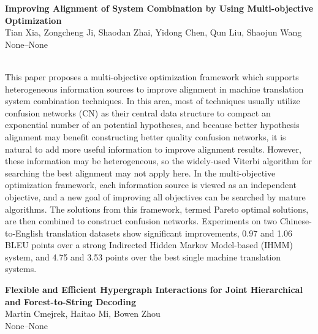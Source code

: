 \documentclass[twoside,makeidx]{book}
\begin{document}
\par\vspace{2em}\noindent%
\begin{minipage}{\linewidth}%
\begin{center}
\textbf{\normalsize Improving Alignment of System Combination by Using Multi-objective Optimization}\\
\normalsize  Tian Xia,  Zongcheng Ji,  Shaodan Zhai,  Yidong Chen,  Qun Liu,  Shaojun Wang\\
{\small None--None}\\
\end{center}
\end{minipage}\\[0.5em]
\nopagebreak%
\noindent%
{\small This paper proposes a multi-objective optimization framework which supports heterogeneous information sources to improve alignment in machine translation system combination techniques. In this area, most of techniques usually utilize confusion networks (CN) as their central data structure to compact an exponential number of an potential hypotheses, and because better hypothesis alignment may benefit constructing better quality confusion networks, it is natural to add more useful information to improve alignment results. However, these information may be heterogeneous, so the widely-used Viterbi algorithm for searching the best alignment may not apply here. In the multi-objective optimization framework, each information source is viewed as an independent objective, and a new goal of improving all objectives can be searched by mature algorithms. The solutions from this framework, termed Pareto optimal solutions, are then combined to construct confusion networks. Experiments on two Chinese-to-English translation datasets show significant improvements, 0.97 and 1.06 BLEU points over a strong Indirected Hidden Markov Model-based (IHMM) system, and 4.75 and 3.53 points over the best single machine translation systems.}
\par\vspace{2em}\noindent%
\begin{minipage}{\linewidth}%
\begin{center}
\textbf{\normalsize Flexible and Efficient Hypergraph Interactions for Joint Hierarchical and Forest-to-String Decoding}\\
\normalsize  Martin Cmejrek,  Haitao Mi,  Bowen Zhou\\
{\small None--None}\\
\end{center}
\end{minipage}\\[0.5em]
\end{document}
